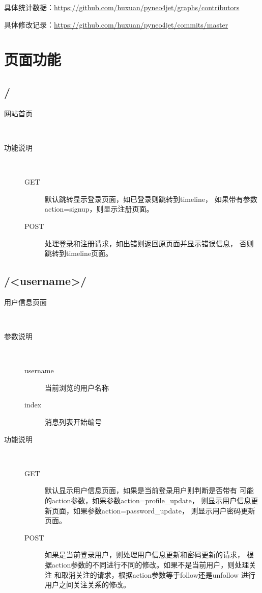 \documentclass{yaldc}
\begin{document}
具体统计数据：\url{https://github.com/huxuan/pyneo4jet/graphs/contributors}

具体修改记录：\url{https://github.com/huxuan/pyneo4jet/commits/master}

\section{页面功能}

\subsection{/}

\begin{description}
    \item[网站首页] ~
    \item[功能说明] ~
        \begin{description}
            \item[GET] 默认跳转显示登录页面，如已登录则跳转到timeline，
                如果带有参数action=signup，则显示注册页面。
            \item[POST] 处理登录和注册请求，如出错则返回原页面并显示错误信息，
                否则跳转到timeline页面。
        \end{description}
\end{description}

\subsection{/<username>/}

\begin{description}
    \item[用户信息页面] ~
    \item[参数说明] ~
        \begin{description}
            \item[username] 当前浏览的用户名称
            \item[index] 消息列表开始编号
        \end{description}
    \item[功能说明] ~
        \begin{description}
            \item[GET] 默认显示用户信息页面，如果是当前登录用户则判断是否带有
                可能的action参数，如果参数action=profile\_update，
                则显示用户信息更新页面，如果参数action=password\_update，
                则显示用户密码更新页面。
            \item[POST] 如果是当前登录用户，则处理用户信息更新和密码更新的请求，
                根据action参数的不同进行不同的修改。如果不是当前用户，则处理关注
                和取消关注的请求，根据action参数等于follow还是unfollow
                进行用户之间关注关系的修改。
        \end{description}
\end{description}
\end{document}

